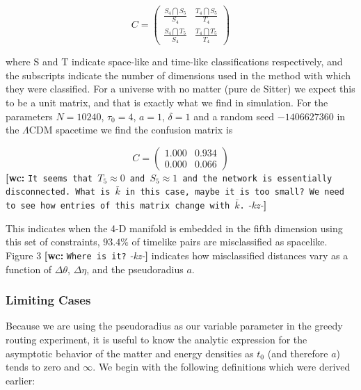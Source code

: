 \documentclass[preprint,notitlepage,amsmath,amssymb,floatfix]{revtex4-1}
\newcommand{\XXX}[3]{{\bf [#1: } {\tt #3} {\it -#2-}{\bf ]}}
\begin{document}
\begin{equation}
C = \left( \begin{array}{cc}
\frac{S_4 \bigcap S_5}{S_4} & \frac{T_4 \bigcap S_5}{T_4} \\
\frac{S_4 \bigcap T_5}{S_4} & \frac{T_4 \bigcap T_5}{T_4} \end{array} \right)
\end{equation}

where S and T indicate space-like and time-like classifications respectively, and the subscripts indicate the number of dimensions used in the method with which they were classified.
For a universe with no matter (pure de Sitter) we expect this to be a unit matrix, and that is exactly what we find in simulation.
For the parameters $N = 10240$, $\tau_0 = 4$, $a = 1$, $\delta = 1$ and a random seed $-1406627360$ in the $\Lambda$CDM spacetime  we find the confusion matrix is

\begin{equation}
C = \left( \begin{array}{cc}
1.000 & 0.934 \\
0.000 & 0.066 \end{array} \right)
\end{equation}
\XXX{wc}{kz}{It seems that $T_5\approx0$ and $S_5\approx1$ and the network is essentially disconnected. What is $\bar{k}$ in this case, maybe it is too small? We need to see how entries of this matrix change with $\bar{k}$.}

This indicates when the 4-D manifold is embedded in the fifth dimension using this set of constraints, $93.4\%$ of timelike pairs are misclassified as spacelike.
Figure 3 \XXX{wc}{kz}{Where is it?} indicates how misclassified distances vary as a function of $\Delta\theta$, $\Delta\eta$, and the pseudoradius $a$.

\subsubsection{Limiting Cases}
Because we are using the pseudoradius as our variable parameter in the greedy routing experiment, it is useful to know the analytic expression for the asymptotic behavior of the matter and energy densities as $t_0$ (and therefore $a$) tends to zero and $\infty$.  We begin with the following definitions which were derived earlier:
\end{document}
